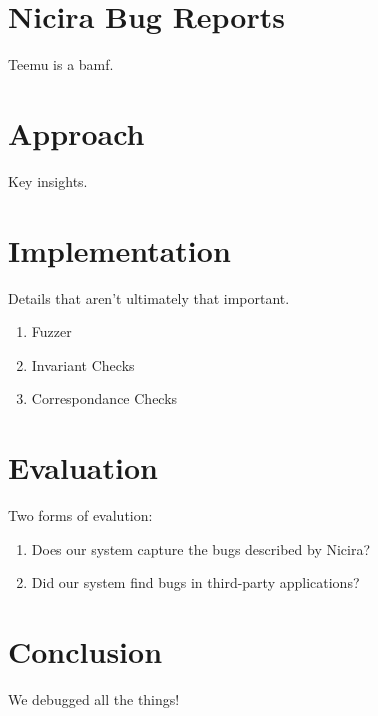 \documentclass{sig-alternate-10pt}
\begin{document}
\section{Nicira Bug Reports}

Teemu is a bamf.

\section{Approach}

Key insights.

\section{Implementation}

Details that aren't ultimately that important.

\begin{enumerate}
\item Fuzzer
\item Invariant Checks
\item Correspondance Checks
\end{enumerate}

\section{Evaluation}

Two forms of evalution:

\begin{enumerate}
\item Does our system capture the bugs described by Nicira?
\item Did our system find bugs in third-party applications?
\end{enumerate}

\section{Conclusion}

We debugged all the things!

\scriptsize



%
\end{document}
